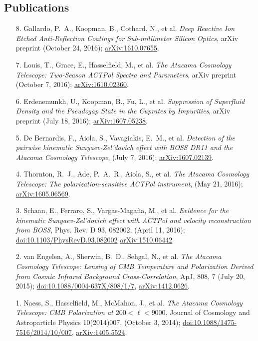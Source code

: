\documentclass[margin,line]{res}
\begin{document}
\begin{resume}
\section{\sc Publications} 
\begin{enumerate}

\item[{8.}] Gallardo, P.~A., Koopman, B., Cothard, N., et al. \textit{Deep
    Reactive Ion Etched Anti-Reflection Coatings for Sub-millimeter Silicon
    Optics}, arXiv preprint (October 24, 2016);
    \href{https://arxiv.org/abs/1610.07655}{arXiv:1610.07655}.
\item[{7.}] Louis, T., Grace, E., Hasselfield, M., et al. \textit{The Atacama
    Cosmology Telescope: Two-Season ACTPol Spectra and Parameters},
    arXiv preprint (October 7, 2016);
    \href{https://arxiv.org/abs/1610.02360}{arXiv:1610.02360}.
\item[{6.}] Erdenemunkh, U., Koopman, B., Fu, L., et al. \textit{Suppression of
    Superfluid Density and the Pseudogap State in the Cuprates by Impurities},
    arXiv preprint (July 18, 2016);
    \href{https://arxiv.org/abs/1607.05238}{arXiv:1607.05238}.
\item[{5.}] De Bernardis, F., Aiola, S., Vavagiakis, E.~M., et al.
    \textit{Detection of the pairwise kinematic Sunyaev-Zel'dovich effect with BOSS
    DR11 and the Atacama Cosmology Telescope}, (July 7, 2016);
    \href{https://arxiv.org/abs/1607.02139}{arXiv:1607.02139}.
\item[{4.}] Thornton, R.~J., Ade, P.~A.~R., Aiola, S., et al. \textit{The
    Atacama Cosmology Telescope: The polarization-sensitive ACTPol instrument},
    (May 21, 2016); \href{https://arxiv.org/abs/1605.06569}{arXiv:1605.06569}.
\item[{3.}] Schaan, E., Ferraro, S., Vargas-Maga{\~n}a, M., et al.
    \textit{Evidence for the kinematic Sunyaev-Zel'dovich effect with ACTPol and
    velocity reconstruction from BOSS}, Phys. Rev. D 93, 082002, (April 11, 2016);
    \href{http://journals.aps.org/prd/abstract/10.1103/PhysRevD.93.082002}{doi:10.1103/PhysRevD.93.082002}
    \href{http://arxiv.org/abs/1510.06442}{arXiv:1510.06442}
\item[{2.}] van Engelen, A., Sherwin, B.~D., Sehgal, N., et al.  \textit{The
    Atacama Cosmology Telescope: Lensing of CMB Temperature and Polarization
    Derived from Cosmic Infrared Background Cross-Correlation}, ApJ, 808, 7 (July
    20, 2015);
    \href{http://dx.doi.org/10.1088/0004-637X/808/1/7}{doi:10.1088/0004-637X/808/1/7},
    \href{http://arxiv.org/abs/1412.0626}{arXiv:1412.0626}.
\item[{1.}] Naess, S., Hasselfield, M., McMahon, J., et al. 
    \textit{The Atacama Cosmology Telescope: CMB Polarization at $200<\ell<9000$}, Journal of Cosmology and Astroparticle Physics 10(2014)007, (October 3, 2014); 
    \href{http://dx.doi.org/10.1088/1475-7516/2014/10/007}{doi:10.1088/1475-7516/2014/10/007}, 
    \href{http://arxiv.org/abs/1405.5524}{arXiv:1405.5524}.
\end{enumerate}


\end{resume}
\end{document}
